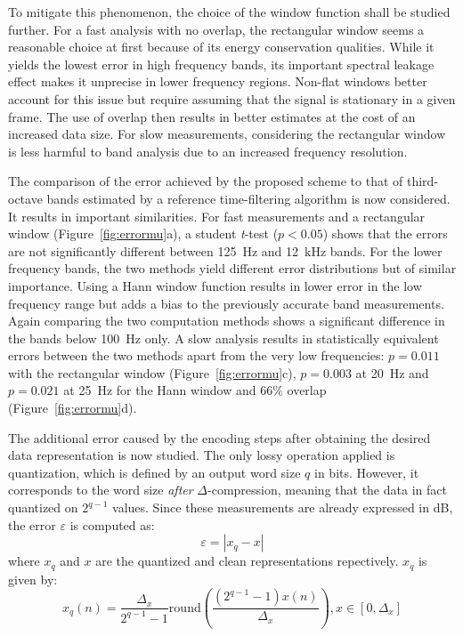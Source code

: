 \documentclass[sensors,article,accept,moreauthors,pdftex,10pt,a4paper]{mdpi}
\begin{document}
To mitigate this phenomenon, the choice of the window function shall be studied further. For a fast analysis with no overlap, the rectangular window seems a reasonable choice at first because of its energy conservation qualities. While it yields the lowest error in high frequency bands, its important spectral leakage effect makes it unprecise in lower frequency regions. Non-flat windows better account for this issue but require assuming that the signal is stationary in a given frame. The use of overlap then results in better estimates at the cost of an increased data size. For slow measurements, considering the rectangular window is less harmful to band analysis due to an increased frequency resolution.

The comparison of the error achieved by the proposed scheme to that of third-octave bands estimated by a reference time-filtering algorithm is now considered. It results in important similarities. For fast measurements and a rectangular window (Figure~\ref{fig:errormu}a), a student \emph{t}-test ($p<0.05$) shows that the errors are not significantly different between 125~Hz and 12~kHz bands. For the lower frequency bands, the two methods yield different error distributions but of similar importance. Using a Hann window function results in lower error in the low frequency range but adds a bias to the previously accurate band measurements. Again comparing the two computation methods shows a significant difference in the bands below 100~Hz only. A slow analysis results in statistically equivalent errors between the two methods apart from the very low frequencies: $p = 0.011$ with the rectangular window (Figure~\ref{fig:errormu}c), $p = 0.003$ at 20~Hz and $p = 0.021$ at 25~Hz for the Hann window and 66\% overlap (Figure~\ref{fig:errormu}d).

The additional error caused by the encoding steps after obtaining the desired data representation is now studied. The only lossy operation applied is quantization, which is defined by an output word size $q$ in bits. However, it corresponds to the word size \textit{after} $\Delta$-compression, meaning that the data  in fact quantized on $2^{q-1}$ values. Since these measurements are already expressed in dB, the error $\varepsilon$ is computed as:
\begin{equation*}
	\varepsilon = |x_q-x|
\end{equation*}
where $x_q$ and $x$ are the quantized and clean representations repectively. $x_q$ is given by:
\begin{equation*}
x_q(n) = \frac{\Delta_x}{2^{q-1}-1}\textrm{round}\left(\frac{(2^{q-1}-1)x(n)}{\Delta_x}\right), x\in \left[0, \Delta_x\right]
\end{equation*}
\end{document}
